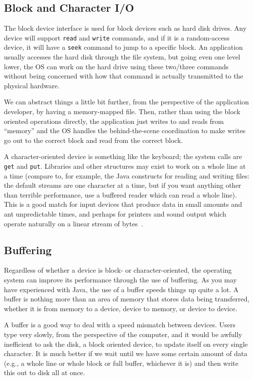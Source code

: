 \subsection*{Block and Character I/O}

The block device interface is used for block devices such as hard disk drives. Any device will support \texttt{read} and \texttt{write} commands, and if it is a random-access device, it will have a \texttt{seek} command to jump to a specific block. An application usually accesses the hard disk through the file system, but going even one level lower, the OS can work on the hard drive using these two/three commands without being concerned with how that command is actually transmitted to the physical hardware.

We can abstract things a little bit further, from the perspective of the application developer, by having a memory-mapped file. Then, rather than using the block oriented operations directly, the application just writes to and reads from ``memory'' and the OS handles the behind-the-scene coordination to make writes go out to the correct block and read from the correct block.

A character-oriented device is something like the keyboard; the system calls are \texttt{get} and \texttt{put}. Libraries and other structures may exist to work on a whole line at a time (compare to, for example, the Java constructs for reading and writing files: the default streams are one character at a time, but if you want anything other than terrible performance, use a buffered reader which can read a whole line). This is a good match for input devices that produce data in small amounts and ant unpredictable times, and perhaps for printers and sound output which operate naturally on a linear stream of bytes~\cite{osc}.


\subsection*{Buffering}

Regardless of whether a device is block- or character-oriented, the operating system can improve its performance through the use of buffering. As you may have experienced with Java, the use of a buffer speeds things up quite a lot. A buffer is nothing more than an area of memory that stores data being transferred, whether it is from memory to a device, device to memory, or device to device. 

A buffer is a good way to deal with a speed mismatch between devices. Users type very slowly, from the perspective of the computer, and it would be awfully inefficient to ask the disk, a block oriented device, to update itself on every single character. It is much better if we wait until we have some certain amount of data (e.g., a whole line or whole block or full buffer, whichever it is) and then write this out to disk all at once. 

